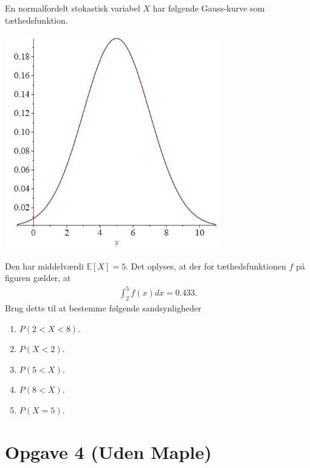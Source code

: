 En normalfordelt stokastisk variabel $X$ har følgende Gauss-kurve som tæthedsfunktion.
\begin{center}
	\includegraphics[width=0.7\textwidth]{Billeder/gauss.jpg}
\end{center}
Den har middelværdi $\mathbb{E}[X] = 5$. Det oplyses, at der for tæthedsfunktionen $f$ på figuren gælder, at
\begin{align*}
	\int_2^5f(x)dx = 0.433.
\end{align*}
Brug dette til at bestemme følgende sandsynligheder
\begin{enumerate}[label=\roman*)]
	\item $P(2<X<8)$.
	\item $P(X<2)$.
	\item $P(5<X)$.
	\item $P(8<X)$.
	\item $P(X=5)$.
\end{enumerate}




\section*{Opgave 4 (Uden Maple)}

